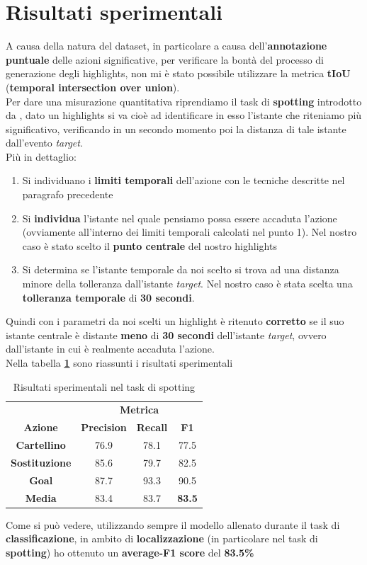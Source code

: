 \section{Risultati sperimentali}
A causa della natura del dataset, in particolare a causa dell'\textbf{annotazione puntuale} delle azioni significative, per verificare la bontà del processo di generazione degli highlights, non mi è stato possibile utilizzare la metrica \textbf{tIoU} (\textbf{temporal intersection over union}).
\\Per dare una misurazione quantitativa riprendiamo il task di \textbf{spotting} introdotto da \citet{soccerNet}, dato un highlights si va cioè ad identificare in esso l'istante che riteniamo più significativo, verificando in un secondo momento poi la distanza di tale istante dall'evento \textit{target}.
\\Più in dettaglio:
\begin{enumerate}
\item Si individuano i \textbf{limiti temporali} dell'azione con le tecniche descritte nel paragrafo precedente
\item Si \textbf{individua} l'istante nel quale pensiamo possa essere accaduta l'azione (ovviamente all'interno dei limiti temporali calcolati nel punto 1). Nel nostro caso è stato scelto il \textbf{punto centrale} del nostro highlights
\item Si determina se l'istante temporale da noi scelto si trova ad una distanza minore della tolleranza dall'istante \textit{target}. Nel nostro caso è stata scelta una \textbf{tolleranza temporale} di \textbf{30 secondi}.
\end{enumerate}
Quindi con i parametri da noi scelti un highlight è ritenuto \textbf{corretto} se il suo istante centrale è distante \textbf{meno} di \textbf{30 secondi} dell'istante \textit{target}, ovvero dall'istante in cui è realmente accaduta l'azione.
\\Nella tabella \textbf{\ref{table: spotting-result}} sono riassunti i risultati sperimentali
\begin{table}[ht]
\caption{Risultati sperimentali nel task di spotting}
\centering
\begin{tabular}{c| | c|c|c}
&\multicolumn{3}{c}{\textbf{Metrica}}\\
\textbf{Azione} & \textbf{Precision} & \textbf{Recall} & \textbf{F1}  \\
\hline
\textbf{Cartellino} & 76.9 & 78.1 & 77.5\\
\textbf{Sostituzione} & 85.6 & 79.7 & 82.5 \\
\textbf{Goal} & 87.7 &  93.3 & 90.5\\
\hline
\textbf{Media} & 83.4 & 83.7 & \textbf{83.5}\\ [1ex]

\end{tabular}
\label{table: spotting-result}
\end{table}

Come si può vedere, utilizzando sempre il modello allenato durante il task di \textbf{classificazione}, in ambito di \textbf{localizzazione} (in particolare nel task di \textbf{spotting}) ho ottenuto un \textbf{average-F1 score} del \textbf{83.5\%}